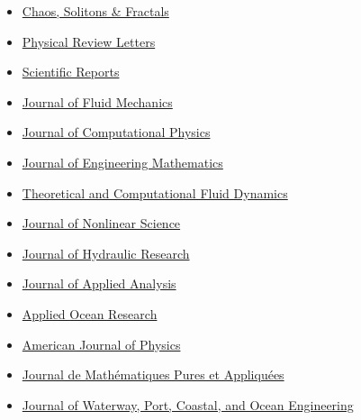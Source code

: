 \documentclass[final, a4paper, oneside, 12pt]{article}
\numberwithin{equation}{section}
\begin{document}
  \begin{itemize}

    \item \href{https://www.sciencedirect.com/journal/chaos-solitons-and-fractals/}{Chaos, Solitons \& Fractals}
  
    \item \href{https://journals.aps.org/prl/}{Physical Review Letters}
  
    \item \href{http://www.nature.com/srep/}%
    {Scientific Reports}
  
    \item \href{http://www.jfm.damtp.cam.ac.uk/}%
    {Journal of Fluid Mechanics}
  
    \item \href{http://www.elsevier.com/locate/jcp}%
    {Journal of Computational Physics}
    
    \item \href{http://www.springer.com/physics/classical+continuum+physics/journal/10665}%
    {Journal of Engineering Mathematics}
    
    \item \href{http://www.springer.com/materials/mechanics/journal/162}%
    {Theoretical and Computational Fluid Dynamics}
    
    \item \href{http://www.springer.com/mathematics/analysis/journal/332}%
    {Journal of Nonlinear Science}
    
    \item \href{http://www.tandfonline.com/toc/tjhr20/current}%
    {Journal of Hydraulic Research}
    
    \item \href{https://www.degruyter.com/view/journals/jaa/jaa-overview.xml}{Journal of Applied Analysis}
    
    \item \href{http://www.journals.elsevier.com/applied-ocean-research/}%
    {Applied Ocean Research}

    \item \href{https://pubs.aip.org/aapt/ajp/}{American Journal of Physics}
    
    \item \href{http://www.journals.elsevier.com/journal-de-mathematiques-pures-et-appliquees/}%
    {Journal de Math\'ematiques Pures et Appliqu\'ees}
    
    \item \href{http://ascelibrary.org/wwo/}%
    {Journal of Waterway, Port, Coastal, and Ocean Engineering}


\end{itemize}
\end{document}

